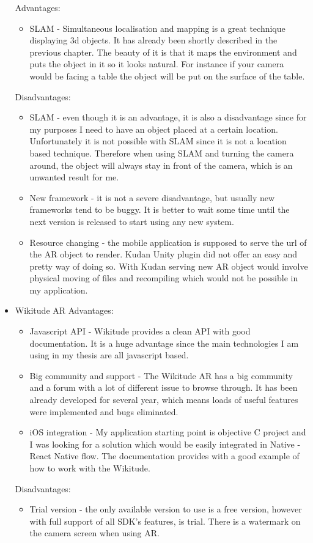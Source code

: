 \documentclass[thesis=M,english]{FITthesis}[2012/10/20]
\begin{document}
\begin{itemize}
	Advantages:
	\begin{itemize}
		\item{SLAM} - Simultaneous localisation and mapping is a great technique displaying 3d objects. It has already been shortly described in the previous chapter. The beauty of it is that it maps the environment and puts the object in it so it looks natural. For instance if your camera would be facing a table the object will be put on the surface of the table.
		
	\end{itemize}
	
	Disadvantages:
	\begin{itemize}
		\item{SLAM} - even though it is an advantage, it is also a disadvantage since for my purposes I need to have an object placed at a certain location. Unfortunately it is not possible with SLAM since it is not a location based technique. Therefore when using SLAM and turning the camera around, the object will always stay in front of the camera, which is an unwanted result for me.
		\item{New framework} - it is not a severe disadvantage, but usually new frameworks tend to be buggy. It is better to wait some time until the next version is released to start using any new system.
		\item{Resource changing} - the mobile application is supposed to serve the url of the AR object to render. Kudan Unity plugin did not offer an easy and pretty way of doing so. With Kudan serving new AR object would involve physical moving of files and recompiling which would not be possible in my application.
	\end{itemize}	
	\item{Wikitude AR}
	Advantages:
	\begin{itemize}
		\item{Javascript API} - Wikitude provides a clean API with good documentation. It is a huge advantage since the main technologies I am using in my thesis are all javascript based.
		\item{Big community and support} - The Wikitude AR has a big community and a forum with a lot of different issue to browse through. It has been already developed for several year, which means loads of useful features were implemented and bugs eliminated.
		\item{iOS integration} - My application starting point is objective C project and I was looking for a solution which would be easily integrated in Native - React Native flow. The documentation provides with a good example of how to work with the Wikitude.
		\			
	\end{itemize}
	
	Disadvantages:
	\begin{itemize}
		\item{Trial version} - the only available version to use is a free version, however with full support of all SDK's features, is trial. There is a watermark on the camera screen when using AR.
	\end{itemize}		
\end{itemize}
\end{document}
